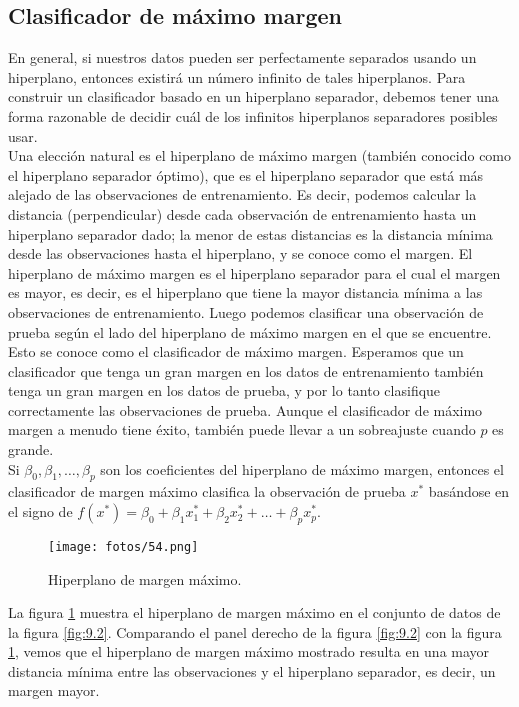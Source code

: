 \subsection{Clasificador de máximo margen}

En general, si nuestros datos pueden ser perfectamente separados usando un hiperplano, entonces existirá un número infinito de tales hiperplanos. Para construir un clasificador basado en un hiperplano separador, debemos tener una forma razonable de decidir cuál de los infinitos hiperplanos separadores posibles usar. \\

Una elección natural es el hiperplano de máximo margen (también conocido como el hiperplano separador óptimo), que es el hiperplano separador que está más alejado de las observaciones de entrenamiento. Es decir, podemos calcular la distancia (perpendicular) desde cada observación de entrenamiento hasta un hiperplano separador dado; la menor de estas distancias es la distancia mínima desde las observaciones hasta el hiperplano, y se conoce como el margen. El hiperplano de máximo margen es el hiperplano separador para el cual el margen es mayor, es decir, es el hiperplano que tiene la mayor distancia mínima a las observaciones de entrenamiento. Luego podemos clasificar una observación de prueba según el lado del hiperplano de máximo margen en el que se encuentre. Esto se conoce como el clasificador de máximo margen. Esperamos que un clasificador que tenga un gran margen en los datos de entrenamiento también tenga un gran margen en los datos de prueba, y por lo tanto clasifique correctamente las observaciones de prueba. Aunque el clasificador de máximo margen a menudo tiene éxito, también puede llevar a un sobreajuste cuando $p$ es grande. \\

Si $\beta_0, \beta_1, \ldots, \beta_p$ son los coeficientes del hiperplano de máximo margen, entonces el clasificador de margen máximo clasifica la observación de prueba $x^*$ basándose en el signo de $f(x^*) = \beta_0 + \beta_1 x^*_1 + \beta_2 x^*_2 + \ldots + \beta_p x^*_p$. \\

\begin{figure}[h]
\centering
\texttt{[image: fotos/54.png]}
\caption{Hiperplano de margen máximo.}
\label{fig:9.3}
\end{figure}

La figura \ref{fig:9.3} muestra el hiperplano de margen máximo en el conjunto de datos de la figura \ref{fig:9.2}. Comparando el panel derecho de la figura \ref{fig:9.2} con la figura \ref{fig:9.3}, vemos que el hiperplano de margen máximo mostrado resulta en una mayor distancia mínima entre las observaciones y el hiperplano separador, es decir, un margen mayor. \\

